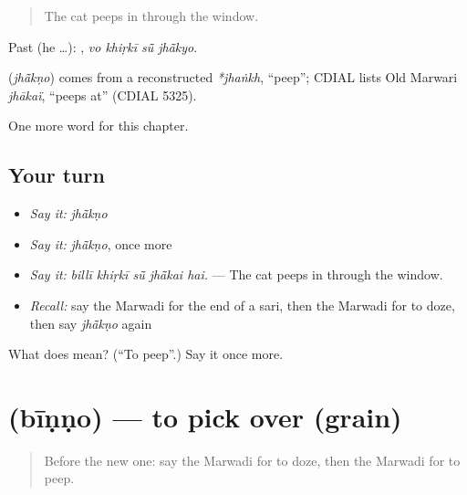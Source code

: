 \begin{quote}
The cat peeps in through the window.
\end{quote}

Past (he …):    , \emph{vo khiṛkī sū̃ jhā̃kyo}.

\begin{cousinweb}
\textbf{} (\emph{jhā̃kṇo}) comes from a reconstructed \emph{*jhaṅkh}, \textquotedblleft{}peep\textquotedblright{}; CDIAL lists Old Marwari \emph{jhākaï}, \textquotedblleft{}peeps at\textquotedblright{} (CDIAL 5325).
\end{cousinweb}

\begin{grammarlens}[title={What you've built}]
One more word for this chapter.
\end{grammarlens}

\subsection*{Your turn}
\begin{itemize}
\raggedright
  \item \emph{Say it:} \emph{jhā̃kṇo}
  \item \emph{Say it:} \emph{jhā̃kṇo}, once more
  \item \emph{Say it:} \emph{billī khiṛkī sū̃ jhā̃kai hai.} — The cat peeps in through the window.
  \item \emph{Recall:} say the Marwadi for the end of a sari, then the Marwadi for to doze, then say \emph{jhā̃kṇo} again
\end{itemize}

\begin{tcolorbox}[breakable,colback=teal!4,colframe=teal!35!black,title={Before you move on}]
What does  mean? (\textquotedblleft{}To peep\textquotedblright{}.) Say it once more.
\end{tcolorbox}
\section[\texorpdfstring{\mw{बीणणो} (bīṇṇo)}{बीणणो (bīṇṇo)}]{ (bīṇṇo) — to pick over (grain)}

\label{lesson:MW-C178-binno}



\begin{quote}
Before the new one: say the Marwadi for to doze, then the Marwadi for to peep.
\end{quote}

